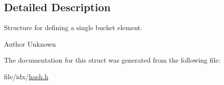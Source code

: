 \subsection{Detailed Description}
Structure for defining a single bucket element. 

\begin{DoxyAuthor}{Author}
Unknown 
\end{DoxyAuthor}


The documentation for this struct was generated from the following file\+:\begin{DoxyCompactItemize}
\item 
file/idx/\hyperlink{hash_8h}{hash.\+h}\end{DoxyCompactItemize}
